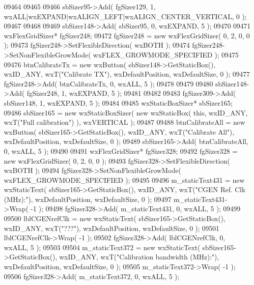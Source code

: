 \begin{DoxyCode}
09464     
09465     
09466     sbSizer95->Add( fgSizer129, 1, wxALL|wxEXPAND|wxALIGN\_LEFT|wxALIGN\_CENTER\_VERTICAL, 0 );
09467     
09468     
09469     sbSizer148->Add( sbSizer95, 0, wxEXPAND, 5 );
09470     
09471     wxFlexGridSizer* fgSizer248;
09472     fgSizer248 = \textcolor{keyword}{new} wxFlexGridSizer( 0, 2, 0, 0 );
09473     fgSizer248->SetFlexibleDirection( wxBOTH );
09474     fgSizer248->SetNonFlexibleGrowMode( wxFLEX\_GROWMODE\_SPECIFIED );
09475     
09476     btnCalibrateTx = \textcolor{keyword}{new} wxButton( sbSizer148->GetStaticBox(), wxID\_ANY, wxT(\textcolor{stringliteral}{"Calibrate TX"}), 
      wxDefaultPosition, wxDefaultSize, 0 );
09477     fgSizer248->Add( btnCalibrateTx, 0, wxALL, 5 );
09478     
09479     
09480     sbSizer148->Add( fgSizer248, 1, wxEXPAND, 5 );
09481     
09482     
09483     fgSizer309->Add( sbSizer148, 1, wxEXPAND, 5 );
09484     
09485     wxStaticBoxSizer* sbSizer165;
09486     sbSizer165 = \textcolor{keyword}{new} wxStaticBoxSizer( \textcolor{keyword}{new} wxStaticBox( \textcolor{keyword}{this}, wxID\_ANY, wxT(\textcolor{stringliteral}{"Full calibration"}) ), 
      wxVERTICAL );
09487     
09488     btnCalibrateAll = \textcolor{keyword}{new} wxButton( sbSizer165->GetStaticBox(), wxID\_ANY, wxT(\textcolor{stringliteral}{"Calibrate All"}), 
      wxDefaultPosition, wxDefaultSize, 0 );
09489     sbSizer165->Add( btnCalibrateAll, 0, wxALL, 5 );
09490     
09491     wxFlexGridSizer* fgSizer328;
09492     fgSizer328 = \textcolor{keyword}{new} wxFlexGridSizer( 0, 2, 0, 0 );
09493     fgSizer328->SetFlexibleDirection( wxBOTH );
09494     fgSizer328->SetNonFlexibleGrowMode( wxFLEX\_GROWMODE\_SPECIFIED );
09495     
09496     m_staticText431 = \textcolor{keyword}{new} wxStaticText( sbSizer165->GetStaticBox(), wxID\_ANY, wxT(\textcolor{stringliteral}{"CGEN Ref. Clk (MHz):"}), 
      wxDefaultPosition, wxDefaultSize, 0 );
09497     m_staticText431->Wrap( -1 );
09498     fgSizer328->Add( m_staticText431, 0, wxALL, 5 );
09499     
09500     lblCGENrefClk = \textcolor{keyword}{new} wxStaticText( sbSizer165->GetStaticBox(), wxID\_ANY, wxT(\textcolor{stringliteral}{"???"}), wxDefaultPosition, 
      wxDefaultSize, 0 );
09501     lblCGENrefClk->Wrap( -1 );
09502     fgSizer328->Add( lblCGENrefClk, 0, wxALL, 5 );
09503     
09504     m_staticText372 = \textcolor{keyword}{new} wxStaticText( sbSizer165->GetStaticBox(), wxID\_ANY, wxT(\textcolor{stringliteral}{"Calibration bandwidth
       (MHz):"}), wxDefaultPosition, wxDefaultSize, 0 );
09505     m_staticText372->Wrap( -1 );
09506     fgSizer328->Add( m_staticText372, 0, wxALL, 5 );

\end{DoxyCode}
